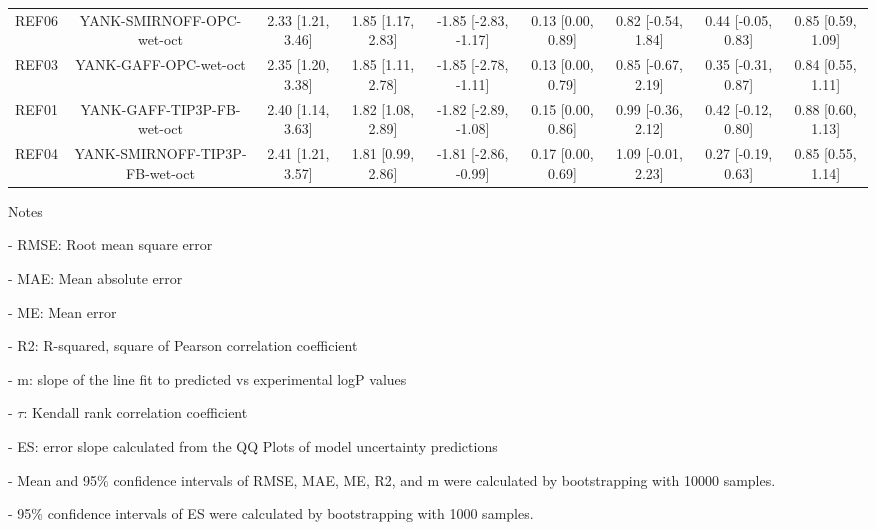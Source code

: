 \documentclass{article}
\begin{document}
\begin{center}
\begin{longtable}{|ccccccccc|}
 REF06 &       YANK-SMIRNOFF-OPC-wet-oct &  2.33 [1.21, 3.46] &  1.85 [1.17, 2.83] &  -1.85 [-2.83, -1.17] &  0.13 [0.00, 0.89] &  0.82 [-0.54, 1.84] &  0.44 [-0.05, 0.83] &    0.85 [0.59, 1.09] \\
 REF03 &           YANK-GAFF-OPC-wet-oct &  2.35 [1.20, 3.38] &  1.85 [1.11, 2.78] &  -1.85 [-2.78, -1.11] &  0.13 [0.00, 0.79] &  0.85 [-0.67, 2.19] &  0.35 [-0.31, 0.87] &    0.84 [0.55, 1.11] \\
 REF01 &      YANK-GAFF-TIP3P-FB-wet-oct &  2.40 [1.14, 3.63] &  1.82 [1.08, 2.89] &  -1.82 [-2.89, -1.08] &  0.15 [0.00, 0.86] &  0.99 [-0.36, 2.12] &  0.42 [-0.12, 0.80] &    0.88 [0.60, 1.13] \\
 REF04 &  YANK-SMIRNOFF-TIP3P-FB-wet-oct &  2.41 [1.21, 3.57] &  1.81 [0.99, 2.86] &  -1.81 [-2.86, -0.99] &  0.17 [0.00, 0.69] &  1.09 [-0.01, 2.23] &  0.27 [-0.19, 0.63] &    0.85 [0.55, 1.14] \\
\end{longtable}
\end{center}

Notes

- RMSE: Root mean square error

- MAE: Mean absolute error

- ME: Mean error

- R2: R-squared, square of Pearson correlation coefficient

- m: slope of the line fit to predicted vs experimental logP values

- $\tau$:  Kendall rank correlation coefficient

- ES: error slope calculated from the QQ Plots of model uncertainty predictions

- Mean and 95\% confidence intervals of RMSE, MAE, ME, R2, and m were calculated by bootstrapping with 10000 samples.

- 95\% confidence intervals of ES were calculated by bootstrapping with 1000 samples.\end{document}
\end{document}
